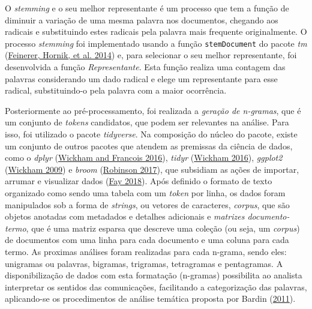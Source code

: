 \documentclass[preprint, 3p,
authoryear]{elsarticle} %
\begin{document}
O \emph{stemming} e o seu melhor representante é um processo que tem a
função de diminuir a variação de uma mesma palavra nos documentos,
chegando aos radicais e substituindo estes radicais pela palavra mais
frequente originalmente. O processo \emph{stemming} foi implementado
usando a função \texttt{stemDocument} do pacote \emph{tm}
(\protect\hyperlink{ref-feinerer2014text}{Feinerer, Hornik, et al.
2014}) e, para selecionar o seu melhor representante, foi desenvolvida a
função \emph{Representante}. Esta função realiza uma contagem das
palavras considerando um dado radical e elege um representante para esse
radical, substituindo-o pela palavra com a maior ocorrência.

Posteriormente ao pré-processamento, foi realizada a \emph{geração de
n-gramas}, que é um conjunto de \emph{tokens} candidatos, que podem ser
relevantes na análise. Para isso, foi utilizado o pacote
\emph{tidyverse}. Na composição do núcleo do pacote, existe um conjunto
de outros pacotes que atendem as premissas da ciência de dados, como o
\emph{dplyr} (\protect\hyperlink{ref-R-dplyr}{Wickham and Francois
2016}), \emph{tidyr} (\protect\hyperlink{ref-R-tidyr}{Wickham 2016}),
\emph{ggplot2} (\protect\hyperlink{ref-R-ggplot2}{Wickham 2009}) e
\emph{broom} (\protect\hyperlink{ref-R-broom}{Robinson 2017}), que
subsidiam as ações de importar, arrumar e visualizar dados
(\protect\hyperlink{ref-Fay2018}{Fay 2018}). Após definido o formato de
texto organizado como sendo uma tabela com um \emph{token} por linha, os
dados foram manipulados sob a forma de \emph{strings}, ou vetores de
caracteres, \emph{corpus}, que são objetos anotadas com metadados e
detalhes adicionais e \emph{matrizes documento-termo}, que é uma matriz
esparsa que descreve uma coleção (ou seja, um \emph{corpus}) de
documentos com uma linha para cada documento e uma coluna para cada
termo. As proximas análises foram realizadas para cada n-grama, sendo
eles: unigramas ou palavras, bigramas, trigramas, tetragramas e
pentagramas. A disponibilização de dados com esta formatação (n-gramas)
possibilita ao analista interpretar os sentidos das comunicações,
facilitando a categorização das palavras, aplicando-se os procedimentos
de análise temática proposta por Bardin
(\protect\hyperlink{ref-bardin2011}{2011}).
\end{document}
